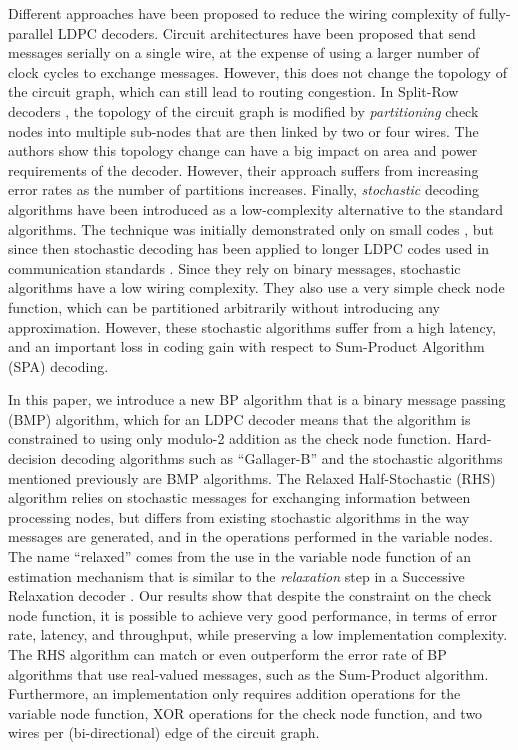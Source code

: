\documentclass[12pt,journal,twoside,draftcls,onecolumn]{IEEEtran}
\begin{document}
Different approaches have been proposed to reduce the wiring complexity of fully-parallel LDPC decoders. Circuit architectures have been proposed \cite{darabiha:2006,cushon:2010} that send messages serially on a single wire, at the expense of using a larger number of clock cycles to exchange messages. However, this does not change the topology of the circuit graph, which can still lead to routing congestion. In Split-Row decoders \cite{mohsenin:2010}, the topology of the circuit graph is modified by \emph{partitioning} check nodes into multiple sub-nodes that are then linked by two or four wires. The authors show this topology change can have a big impact on area and power requirements of the decoder. However, their approach suffers from increasing error rates as the number of partitions increases.
Finally, \emph{stochastic} decoding algorithms have been introduced as a low-complexity alternative to the standard algorithms. The technique was initially demonstrated only on small codes \cite{rapley:2003}, but since then stochastic decoding has been applied to longer LDPC codes used in communication standards \cite{sharifi-tehrani:2010}.
Since they rely on binary messages, stochastic algorithms have a low wiring complexity. They also use a very simple check node function, which can be partitioned arbitrarily without introducing any approximation. However, these stochastic algorithms suffer from a high latency, and an important loss in coding gain with respect to Sum-Product Algorithm (SPA) decoding.

In this paper, we introduce a new BP algorithm that is a binary message passing (BMP) algorithm, which for an LDPC decoder means that the algorithm is constrained to using only modulo-2 addition as the check node function. Hard-decision decoding algorithms such as ``Gallager-B'' and the stochastic algorithms mentioned previously are BMP algorithms.
The Relaxed Half-Stochastic (RHS) algorithm relies on stochastic messages for exchanging information between processing nodes, but differs from existing stochastic algorithms in the way messages are generated, and in the operations performed in the variable nodes. The name ``relaxed'' comes from the use in the variable node function of an estimation mechanism that is similar to the \emph{relaxation} step in a Successive Relaxation decoder \cite{hemati:2006a}.
Our results show that despite the constraint on the check node function, it is possible to achieve very good performance, in terms of error rate, latency, and throughput, while preserving a low implementation complexity.
The RHS algorithm can match or even outperform the error rate of BP algorithms that use real-valued messages, such as the Sum-Product algorithm.
Furthermore, an implementation only requires addition operations for the variable node function, XOR operations for the check node function, and two wires per (bi-directional) edge of the circuit graph. 
\end{document}
